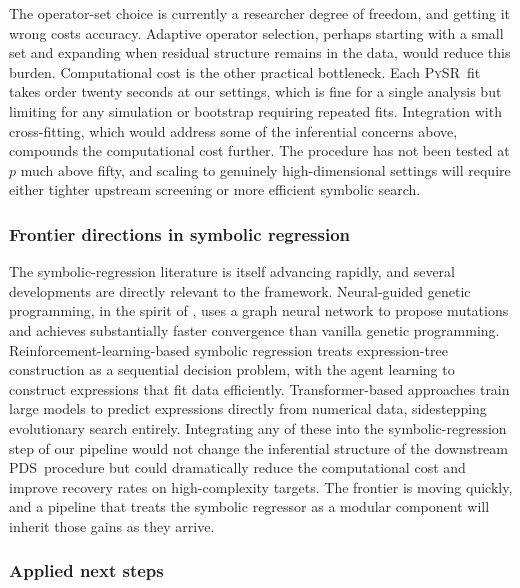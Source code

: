 \documentclass[11pt, a4paper]{article}
\theoremstyle{plain}
\theoremstyle{definition}
\theoremstyle{remark}
\newcommand{\pds}{\textsc{PDS}}
\newcommand{\pysr}{\textsc{PySR}}
\begin{document}
The operator-set choice is
currently a researcher degree of freedom, and getting it wrong
costs accuracy. Adaptive operator selection, perhaps starting
with a small set and expanding when residual structure remains
in the data, would reduce this burden. Computational cost is
the other practical bottleneck. Each \pysr\ fit takes order
twenty seconds at our settings, which is fine for a single
analysis but limiting for any simulation or bootstrap requiring
repeated fits. Integration with cross-fitting, which would
address some of the inferential concerns above, compounds the
computational cost further. The procedure has not been tested
at $p$ much above fifty, and scaling to genuinely
high-dimensional settings will require either tighter upstream
screening or more efficient symbolic search.

\subsubsection{Frontier directions in symbolic regression}

The symbolic-regression literature is itself advancing rapidly,
and several developments are directly relevant to the framework.
Neural-guided genetic programming, in the spirit of
\citet{cranmer2020}, uses a graph neural network to propose
mutations and achieves substantially faster convergence than
vanilla genetic programming. Reinforcement-learning-based
symbolic regression treats expression-tree construction as a
sequential decision problem, with the agent learning to
construct expressions that fit data efficiently.
Transformer-based approaches train large models to predict
expressions directly from numerical data, sidestepping
evolutionary search entirely. Integrating any of these into
the symbolic-regression step of our pipeline would not change
the inferential structure of the downstream \pds\ procedure but
could dramatically reduce the computational cost and improve
recovery rates on high-complexity targets. The frontier is
moving quickly, and a pipeline that treats the symbolic
regressor as a modular component will inherit those gains as
they arrive.

\subsubsection{Applied next steps}
\end{document}
